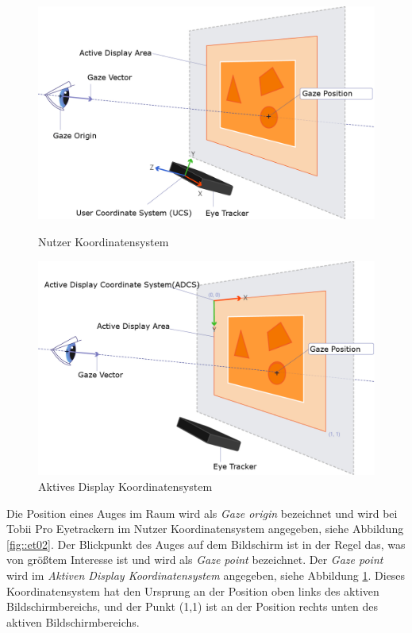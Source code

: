 \begin{figure}[]
	\centering
	\begin{minipage}[b]{0.49\textwidth}
		\centering
		\includegraphics[width=1\textwidth]{../../Grafiken/UCS.png}
		\caption{Nutzer Koordinatensystem \cite{tobiisdk}}
		\label{fig::et02}
	\end{minipage}
	\hfill
	\begin{minipage}[b]{0.49\textwidth}
		\centering
		\includegraphics[width=1\textwidth]{../../Grafiken/ADCS.png}
		\caption{Aktives Display Koordinatensystem \cite{tobiisdk}}
		\label{fig::et03}
	\end{minipage}
\end{figure}

Die Position eines Auges im Raum wird als \emph{Gaze origin} bezeichnet und wird bei Tobii Pro Eyetrackern im Nutzer Koordinatensystem angegeben, siehe Abbildung \ref{fig::et02}.
Der Blickpunkt des Auges auf dem Bildschirm ist in der Regel das, was von größtem Interesse ist und wird als \emph{Gaze point} bezeichnet.
Der \emph{Gaze point} wird im \emph{Aktiven Display Koordinatensystem} angegeben, siehe Abbildung \ref{fig::et03}.
Dieses Koordinatensystem hat den Ursprung an der Position oben links des aktiven Bildschirmbereichs, und der Punkt (1,1) ist an der Position rechts unten des aktiven Bildschirmbereichs.

